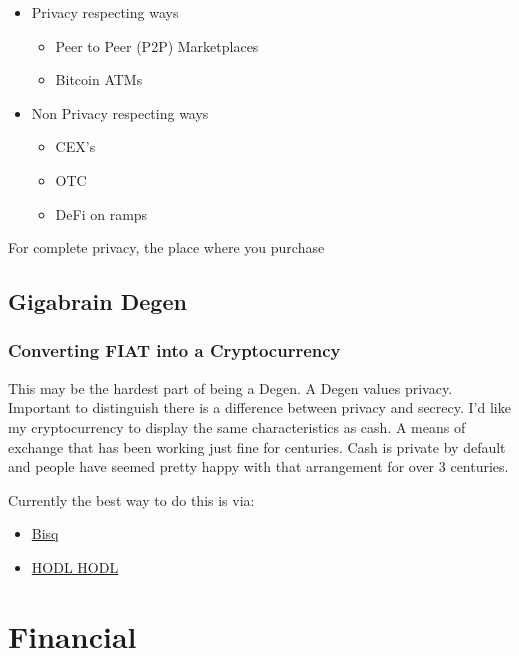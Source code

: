 \documentclass[
  letterpaper,
  DIV=11,
  numbers=noendperiod]{scrreprt}
\providecommand{\tightlist}{%
  \setlength{\itemsep}{0pt}\setlength{\parskip}{0pt}}\usepackage{longtable,booktabs,array}
\begin{document}
\begin{itemize}
\tightlist
\item
  Privacy respecting ways

  \begin{itemize}
  \tightlist
  \item
    Peer to Peer (P2P) Marketplaces
  \item
    Bitcoin ATMs
  \end{itemize}
\item
  Non Privacy respecting ways

  \begin{itemize}
  \tightlist
  \item
    CEX's
  \item
    OTC
  \item
    DeFi on ramps
  \end{itemize}
\end{itemize}

For complete privacy, the place where you purchase

\chapter{Gigabrain Degen}\label{gigabrain-degen}

\section{Converting FIAT into a
Cryptocurrency}\label{converting-fiat-into-a-cryptocurrency}

This may be the hardest part of being a Degen. A Degen values privacy.
Important to distinguish there is a difference between privacy and
secrecy. I'd like my cryptocurrency to display the same characteristics
as cash. A means of exchange that has been working just fine for
centuries. Cash is private by default and people have seemed pretty
happy with that arrangement for over 3 centuries.

Currently the best way to do this is via:

\begin{itemize}
\tightlist
\item
  \href{https://bisq.network/}{Bisq}
\item
  \href{https://hodlhodl.com/}{HODL HODL}
\end{itemize}

\part{Financial}
\end{document}
